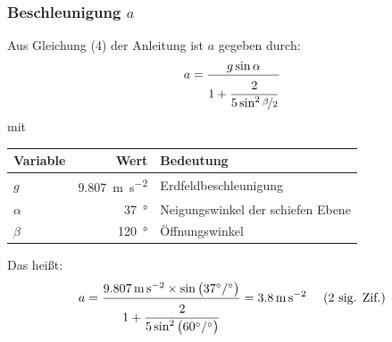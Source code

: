 \documentclass[twoside]{article}
\begin{document}
        \subsubsection{Beschleunigung $a$}
            Aus Gleichung (4) der Anleitung ist $a$ gegeben durch:
            \begin{equation}
                a = \frac{g \sin \alpha}{1 + \displaystyle \frac{\rule{0pt}{1em} 2}{5 \sin^2 \nicefrac{\beta}{2}}}
            \end{equation}
            mit
            \begin{center}
                \begin{tabular}{lrl}
                    \toprule
                    Variable & Wert & Bedeutung \\
                    \midrule
                    $g$ & \SI{9.807}{\meter\per\second\squared} & Erdfeldbeschleunigung \\
                    $\alpha$ & \SI{37}{\degree} & Neigungswinkel der schiefen Ebene \\
                    $\beta$ & \SI{120}{\degree} & Öffnungswinkel \\
                    \bottomrule
                \end{tabular}
            \end{center}
            Das heißt: 
            \begin{equation}
                a = \frac{\SI{9.807}{\meter\per\second\squared} \times \sin \left(\SI{37}{\degree} / \SI{}{\degree}\right)}{1 + \displaystyle \frac{\rule{0pt}{1em} 2}{5 \sin^2 \left(\SI{60}{\degree}/\SI{}{\degree}\right)}} = \SI{3.8}{\meter\per\second\squared} \text{~~~~(2 sig. Zif.)}
            \end{equation}
\end{document}
